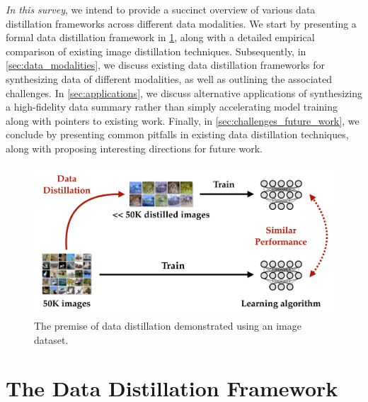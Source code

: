 \documentclass[10pt]{article} %
\begin{document}
\emph{In this survey}, we intend to provide a succinct overview of various data distillation frameworks across different data modalities. We start by presenting a formal data distillation framework
in \cref{sec:framework}, along with a detailed empirical comparison of existing image distillation techniques. Subsequently, in \cref{sec:data_modalities}, we discuss existing data distillation frameworks for synthesizing data of different modalities, as well as outlining the associated challenges. In \cref{sec:applications}, we discuss alternative applications of synthesizing a high-fidelity data summary rather than simply accelerating model training along with pointers to existing work. Finally, in \cref{sec:challenges_future_work}, we conclude by presenting common pitfalls in existing data distillation techniques, along with proposing interesting directions for future work.

\begin{figure}[t!] \centering
    \centering
    \includegraphics[width=0.7\linewidth]{figures/overview.pdf}
    \vspace{4pt}
    \renewcommand\figurename{\href{https://www.noveens.com/images/dd_survey/overview.pdf}{[HQ Image Link]} Figure}
    \caption{The premise of data distillation demonstrated using an image dataset.}
    \label{fig:overview}
\end{figure} 

\section{The Data Distillation Framework} \label{sec:framework}
\end{document}

